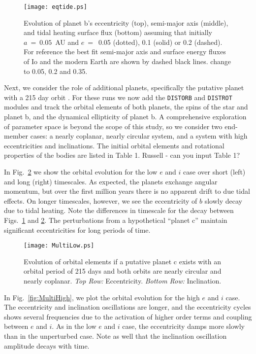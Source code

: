 \documentclass[preprint,12pt]{aastex}
\newcommand{\xxx}[1]{{\color{red} #1}} %
\def\distorb{\texttt{\footnotesize{DISTORB}}\xspace}
\def\distrot{\texttt{\footnotesize{DISTROT}}\xspace}
\begin{document}
\begin{figure} 
\begin{center}
\texttt{[image: eqtide.ps]}
\end{center}
\caption{Evolution of planet b's eccentricity (top), semi-major axis (middle), and tidal heating surface flux (bottom) assuming that initially $a~=~0.05$~AU and $e~=$~0.05 (dotted), 0.1 (solid) or 0.2 (dashed). For reference the best fit semi-major axis and surface energy fluxes of Io and the modern Earth are shown by dashed black lines. \xxx{change to 0.05, 0.2 and 0.35.}}
\label{fig:eqtide}
\end{figure}

Next, we consider the role of additional planets, specifically the
putative planet with a 215 day orbit \citep{AngladaEscude16}. For
these runs we now add the \distorb and \distrot modules and track the
orbital elements of both planets, the spins of the star and planet b,
and the dynamical ellipticity of planet b. A comprehensive exploration
of parameter space is beyond the scope of this study, so we consider
two end-member cases: a nearly coplanar, nearly circular system, and a
system with high eccentricities and inclinations. The initial orbital
elements and rotational properties of the bodies are listed in Table
1. \xxx{Russell - can you input Table 1?}

In Fig.~\ref{fig:MultiLow} we show the orbital evolution for the low
$e$ and $i$ case over short (left) and long (right) timescales. As
expected, the planets exchange angular momentum, but over the first
million years there is no apparent drift to due tidal effects. On
longer timescales, however, we see the eccentricity of $b$ slowly decay
due to tidal heating. Note the differences in timescale for the decay
between Figs.~\ref{fig:eqtide} and \ref{fig:MultiLow}. The
perturbations from a hypothetical ``planet c'' maintain significant
eccentricities for long periods of time.

\begin{figure} 
\begin{center}
\texttt{[image: MultiLow.ps]}
\end{center}
\caption{Evolution of orbital elements if a putative planet c exists with an orbital period of 215 days and both orbits are nearly circular and nearly coplanar. {\it Top Row:} Eccentricity. {\it Bottom Row:} Inclination.}
\label{fig:MultiLow}
\end{figure}

In Fig.~\ref{fig:MultiHigh}, we plot the orbital evolution for the
high $e$ and $i$ case. The eccentricity and inclination oscillations
are longer, and the eccentricity cycles shows several frequencies due
to the activation of higher order terms and coupling between $e$ and
$i$. As in the low $e$ and $i$ case, the eccentricity damps more
slowly than in the unperturbed case. Note as well that the inclination
oscillation amplitude decays with time.
\end{document}
